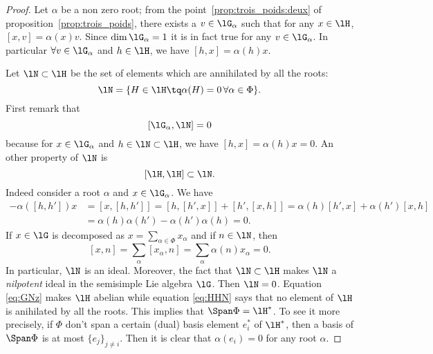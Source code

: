 \begin{proof}
	Let $\alpha$ be a non zero root; from the point~\ref{prop:trois_poids:deux} of proposition~\ref{prop:trois_poids}, there exists a $v\in\lG_{\alpha}$ such that for any $x\in\lH$, $[x,v]=\alpha(x)v$. Since $\dim\lG_{\alpha}=1$ it is in fact true for any $v\in\lG_{\alpha}$. In particular $\forall v\in\lG_{\alpha}$ and $h\in\lH$, we have $[h,x]=\alpha(h)x$.

	Let $\lN\subset\lH$ be the set of elements which are annihilated by all the roots:
	\begin{equation}
		\lN=\{ H\in\lH\tq\alpha(H)=0\,\forall \alpha\in\Phi \}.
	\end{equation}
	First remark that
	\begin{equation}\label{eq:GNz}
		[\lG_{\alpha},\lN]=0
	\end{equation}
	because for $x\in\lG_{\alpha}$ and $h\in\lN\subset\lH$, we have $[h,x]=\alpha(h)x=0$. An other property of $\lN$ is
	\begin{equation}\label{eq:HHN}
		[\lH,\lH]\subset\lN.
	\end{equation}
	Indeed consider a root $\alpha$ and $x\in\lG_{\alpha}$. We have
	\begin{equation}
		\begin{split}
			-\alpha([h,h'])x&=[x,[h,h']]
			=[h,[h',x]]+[h',[x,h]]
			=\alpha(h)[h',x]+\alpha(h')[x,h]\\
			&=\alpha(h)\alpha(h')-\alpha(h')\alpha(h)
			=0.
		\end{split}
	\end{equation}
	If $x\in\lG$ is decomposed as $x=\sum_{\alpha\in\Phi}x_{\alpha}$ and if $n\in\lN$, then
	\[
		[x,n]=\sum_{\alpha}[x_{\alpha},n]=\sum_{\alpha}\alpha(n)x_{\alpha}=0.
	\]
	In particular, $\lN$ is an ideal. Moreover, the fact that $\lN\subset\lH$ makes $\lN$ a \emph{nilpotent} ideal in the semisimple Lie algebra $\lG$. Then $\lN=0$. Equation \eqref{eq:GNz} makes $\lH$ abelian while equation \eqref{eq:HHN} says that no element of $\lH$ is anihilated by all the roots. This implies that $\Span\Phi=\lH^*$. To see it more precisely, if $\Phi$ don't span a certain (dual) basis element $e_i^*$ of $\lH^*$, then a basis of $\Span\Phi$ is at most $\{e_j\}_{j\neq i}$. Then it is clear that $\alpha(e_i)=0$ for any root $\alpha$.
\end{proof}


